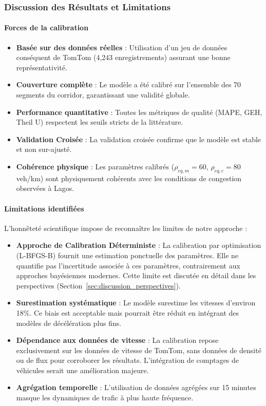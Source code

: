 \subsubsection{Discussion des Résultats et Limitations}
\label{subsec:resultats_jumeau}

\paragraph{Forces de la calibration}
\begin{itemize}
    \item \textbf{Basée sur des données réelles} : Utilisation d'un jeu de données conséquent de TomTom (4,243 enregistrements) assurant une bonne représentativité.
    \item \textbf{Couverture complète} : Le modèle a été calibré sur l'ensemble des 70 segments du corridor, garantissant une validité globale.
    \item \textbf{Performance quantitative} : Toutes les métriques de qualité (MAPE, GEH, Theil U) respectent les seuils stricts de la littérature.
    \item \textbf{Validation Croisée} : La validation croisée confirme que le modèle est stable et non sur-ajusté.
    \item \textbf{Cohérence physique} : Les paramètres calibrés ($\rho_{eq,m}=60$, $\rho_{eq,c}=80$ veh/km) sont physiquement cohérents avec les conditions de congestion observées à Lagos.
\end{itemize}

\paragraph{Limitations identifiées}
L'honnêteté scientifique impose de reconnaître les limites de notre approche :
\begin{itemize}
    \item \textbf{Approche de Calibration Déterministe} : La calibration par optimisation (L-BFGS-B) fournit une estimation ponctuelle des paramètres. Elle ne quantifie pas l'incertitude associée à ces paramètres, contrairement aux approches bayésiennes modernes. Cette limite est discutée en détail dans les perspectives (Section~\ref{sec:discussion_perspectives}).
    \item \textbf{Surestimation systématique} : Le modèle surestime les vitesses d'environ 18\%. Ce biais est acceptable mais pourrait être réduit en intégrant des modèles de décélération plus fins.
    \item \textbf{Dépendance aux données de vitesse} : La calibration repose exclusivement sur les données de vitesse de TomTom, sans données de densité ou de flux pour corroborer les résultats. L'intégration de comptages de véhicules serait une amélioration majeure.
    \item \textbf{Agrégation temporelle} : L'utilisation de données agrégées sur 15 minutes masque les dynamiques de trafic à plus haute fréquence.
\end{itemize}

